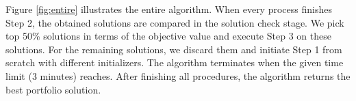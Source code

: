 \documentclass[11pt]{article}
\begin{document}
	Figure \ref{fig:entire} illustrates the entire algorithm. When every process finishes Step 2, the obtained solutions are compared in the solution check stage. We pick top 50\% solutions in terms of the objective value and execute Step 3 on these solutions. For the remaining solutions, we discard them and initiate Step 1 from scratch with different initializers. The algorithm terminates when the given time limit (3 minutes) reaches. After finishing all procedures, the algorithm returns the best portfolio solution. 
	
	
	
\end{document}
